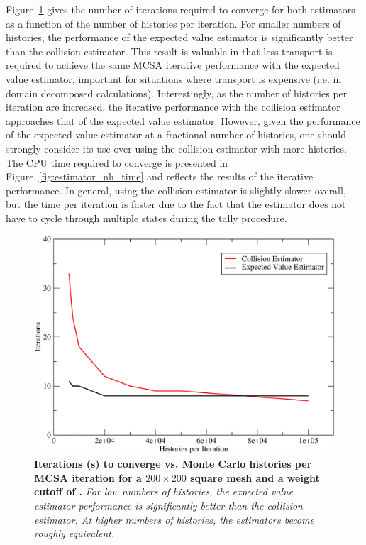 Figure~\ref{fig:estimator_nh_iters} gives the number of iterations
required to converge for both estimators as a function of the number
of histories per iteration. For smaller numbers of histories, the
performance of the expected value estimator is significantly better
than the collision estimator. This result is valuable in that less
transport is required to achieve the same MCSA iterative performance
with the expected value estimator, important for situations where
transport is expensive (i.e. in domain decomposed
calculations). Interestingly, as the number of histories per iteration
are increased, the iterative performance with the collision estimator
approaches that of the expected value estimator. However, given the
performance of the expected value estimator at a fractional number of
histories, one should strongly consider its use over using the
collision estimator with more histories. The CPU time required to
converge is presented in Figure~\ref{fig:estimator_nh_time} and
reflects the results of the iterative performance. In general, using
the collision estimator is slightly slower overall, but the time per
iteration is faster due to the fact that the estimator does not have
to cycle through multiple states during the tally procedure.

\begin{figure}[t!]
  \centering
  \includegraphics[width=4.75in,clip]{chapters/mc_background/estimator_nh_iters.pdf}
  \caption{\textbf{Iterations (s) to converge vs. Monte Carlo
      histories per MCSA iteration for a $200 \times 200$ square mesh
      and a weight cutoff of .} \textit{For low numbers of
      histories, the expected value estimator performance is
      significantly better than the collision estimator. At higher
      numbers of histories, the estimators become roughly
      equivalent.}}
  \label{fig:estimator_nh_iters}
\end{figure}

